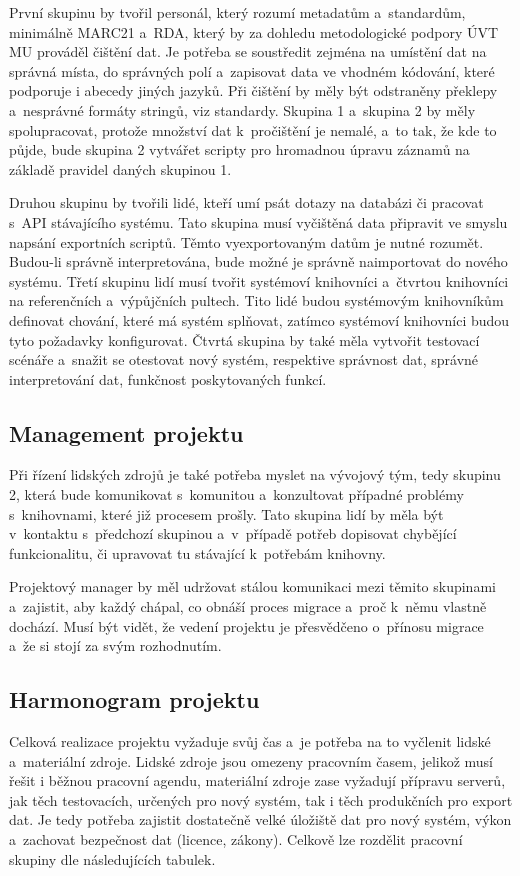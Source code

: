 \documentclass[
	11pt, oneside, printed, final, palatino, monochrome
	microtype,
	table,   %
	lof,     %
	lot     %
]{fithesis3}
\begin{document}
{První skupinu by tvořil personál, který rozumí metadatům a~standardům, minimálně MARC21 a~RDA, který by za dohledu metodologické podpory ÚVT MU prováděl čištění dat. Je potřeba se soustředit zejména na umístění dat na správná místa, do správných polí a~zapisovat data ve vhodném kódování, které podporuje i abecedy jiných jazyků. Při čištění by měly být odstraněny překlepy a~nesprávné formáty stringů, viz standardy. Skupina 1 a~skupina 2 by měly spolupracovat, protože množství dat k~pročištění je nemalé, a~to tak, že kde to půjde, bude skupina 2 vytvářet scripty pro hromadnou úpravu záznamů na základě pravidel daných skupinou 1.

Druhou skupinu by tvořili lidé, kteří umí psát dotazy na databázi či pracovat s~API stávajícího systému. Tato skupina musí vyčištěná data připravit ve smyslu napsání exportních scriptů. Těmto vyexportovaným datům je nutné  rozumět. Budou-li správně interpretována, bude možné je správně naimportovat do nového systému.
Třetí skupinu lidí musí tvořit systémoví knihovníci a~čtvrtou knihovníci na referenčních a~výpůjčních pultech. Tito lidé budou systémovým knihovníkům definovat chování, které má systém splňovat, zatímco systémoví knihovníci budou tyto požadavky konfigurovat. Čtvrtá skupina by také měla vytvořit testovací scénáře a~snažit se otestovat nový systém, respektive správnost dat, správné interpretování dat, funkčnost poskytovaných funkcí.

\subsection{Management projektu}
Při řízení lidských zdrojů je také potřeba myslet na vývojový tým, tedy skupinu 2, která bude komunikovat s~komunitou a~konzultovat případné problémy s~knihovnami, které již procesem prošly. Tato skupina lidí by měla být v~kontaktu s~předchozí skupinou a~v~případě potřeb dopisovat chybějící funkcionalitu, či upravovat tu stávající k~potřebám knihovny.

Projektový manager by měl udržovat stálou komunikaci mezi těmito skupinami a~zajistit, aby každý chápal, co obnáší proces migrace a~proč k~němu vlastně dochází. Musí být vidět, že vedení projektu je přesvědčeno o~přínosu migrace a~že si stojí za svým rozhodnutím. 

\subsection{Harmonogram projektu}
Celková realizace projektu vyžaduje svůj čas a~je potřeba na to vyčlenit lidské a~materiální zdroje. Lidské zdroje jsou omezeny pracovním časem, jelikož musí řešit i běžnou pracovní agendu, materiální zdroje zase vyžadují přípravu serverů, jak těch testovacích, určených pro nový systém, tak i těch produkčních pro export dat. Je tedy potřeba zajistit dostatečně velké úložiště dat pro nový systém, výkon a~zachovat bezpečnost dat (licence, zákony). Celkově lze rozdělit pracovní skupiny dle následujících tabulek.

}
\end{document}
